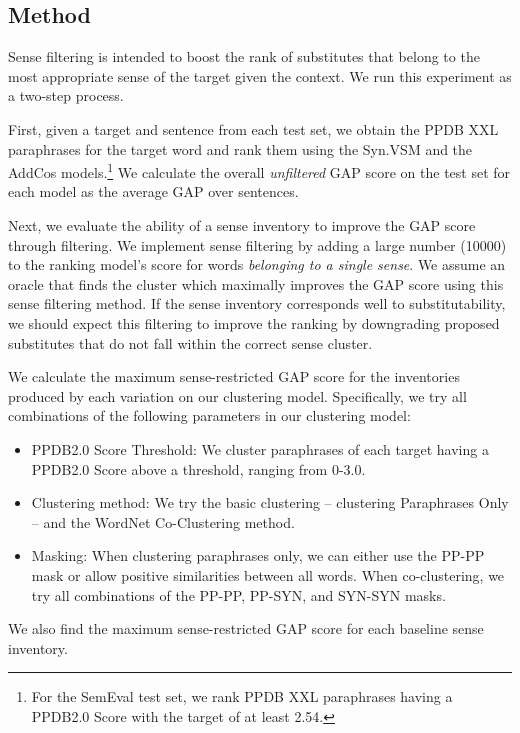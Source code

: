 \documentclass[11pt]{article}
\begin{document}
\subsection{Method}

Sense filtering is intended to boost the rank of substitutes that belong to the most appropriate sense of the target given the context. We run this experiment as a two-step process.

First, given a target and sentence from each test set, we obtain the PPDB XXL paraphrases for the target word and rank them using the Syn.VSM and the AddCos models.\footnote{For the SemEval test set, we rank PPDB XXL paraphrases having a PPDB2.0 Score with the target of at least 2.54.} We calculate the overall \textit{unfiltered} GAP score on the test set for each model as the average GAP over sentences.

Next, we evaluate the ability of a sense inventory to improve the GAP score through filtering. We implement sense filtering by adding a large number (10000) to the ranking model's score for words \textit{belonging to a single sense}. We assume an oracle that finds the cluster which maximally improves the GAP score using this sense filtering method. If the sense inventory corresponds well to substitutability, we should expect this filtering to improve the ranking by downgrading proposed substitutes that do not fall within the correct sense cluster. 

We calculate the maximum sense-restricted GAP score for the inventories produced by each variation on our clustering model. Specifically, we try all combinations of the following parameters in our clustering model:

\begin{itemize}
	\item PPDB2.0 Score Threshold: We cluster paraphrases of each target having a PPDB2.0 Score above a threshold, ranging from 0-3.0.
	\item Clustering method: We try the basic clustering -- clustering Paraphrases Only -- and the WordNet Co-Clustering method.
	\item Masking: When clustering paraphrases only, we can either use the PP-PP mask or allow positive similarities between all words. When co-clustering, we try all combinations of the PP-PP, PP-SYN, and SYN-SYN masks.
\end{itemize}

\noindent We also find the maximum sense-restricted GAP score for each baseline sense inventory.
\end{document}
